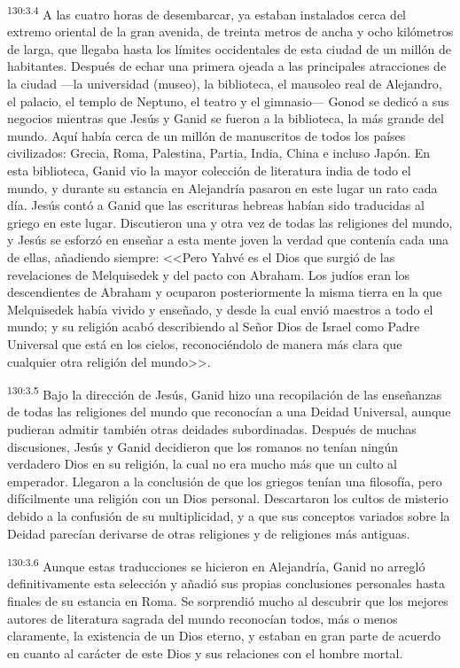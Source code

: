 \par 
\textsuperscript{130:3.4} A las cuatro horas de desembarcar, ya estaban instalados cerca del extremo oriental de la gran avenida, de treinta metros de ancha y ocho kilómetros de larga, que llegaba hasta los límites occidentales de esta ciudad de un millón de habitantes. Después de echar una primera ojeada a las principales atracciones de la ciudad ---la universidad (museo), la biblioteca, el mausoleo real de Alejandro, el palacio, el templo de Neptuno, el teatro y el gimnasio--- Gonod se dedicó a sus negocios mientras que Jesús y Ganid se fueron a la biblioteca, la más grande del mundo. Aquí había cerca de un millón de manuscritos de todos los países civilizados: Grecia, Roma, Palestina, Partia, India, China e incluso Japón. En esta biblioteca, Ganid vio la mayor colección de literatura india de todo el mundo, y durante su estancia en Alejandría pasaron en este lugar un rato cada día. Jesús contó a Ganid que las escrituras hebreas habían sido traducidas al griego en este lugar. Discutieron una y otra vez de todas las religiones del mundo, y Jesús se esforzó en enseñar a esta mente joven la verdad que contenía cada una de ellas, añadiendo siempre: <<Pero Yahvé es el Dios que surgió de las revelaciones de Melquisedek y del pacto con Abraham. Los judíos eran los descendientes de Abraham y ocuparon posteriormente la misma tierra en la que Melquisedek había vivido y enseñado, y desde la cual envió maestros a todo el mundo; y su religión acabó describiendo al Señor Dios de Israel como Padre Universal que está en los cielos, reconociéndolo de manera más clara que cualquier otra religión del mundo>>.

\par 
\textsuperscript{130:3.5} Bajo la dirección de Jesús, Ganid hizo una recopilación de las enseñanzas de todas las religiones del mundo que reconocían a una Deidad Universal, aunque pudieran admitir también otras deidades subordinadas. Después de muchas discusiones, Jesús y Ganid decidieron que los romanos no tenían ningún verdadero Dios en su religión, la cual no era mucho más que un culto al emperador. Llegaron a la conclusión de que los griegos tenían una filosofía, pero difícilmente una religión con un Dios personal. Descartaron los cultos de misterio debido a la confusión de su multiplicidad, y a que sus conceptos variados sobre la Deidad parecían derivarse de otras religiones y de religiones más antiguas.

\par 
\textsuperscript{130:3.6} Aunque estas traducciones se hicieron en Alejandría, Ganid no arregló definitivamente esta selección y añadió sus propias conclusiones personales hasta finales de su estancia en Roma. Se sorprendió mucho al descubrir que los mejores autores de literatura sagrada del mundo reconocían todos, más o menos claramente, la existencia de un Dios eterno, y estaban en gran parte de acuerdo en cuanto al carácter de este Dios y sus relaciones con el hombre mortal.

